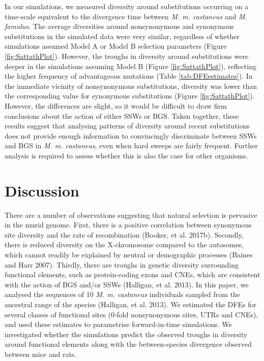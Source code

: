	In our simulations, we measured diversity around substitutions occurring on a time-scale equivalent to the divergence time between \textit{M. m. castaneus} and \textit{M. famulus}. The average diversities around nonsynonymous and synonymous substitutions in the simulated data were very similar, regardless of whether simulations assumed Model A or Model B selection parameters (Figure \ref{fig:SattathPlot}). However, the troughs in diversity around substitutions were deeper in the simulations assuming Model B (Figure \ref{fig:SattathPlot}), reflecting the higher frequency of advantageous mutations (Table \ref{tab:DFEestimates}). In the immediate vicinity of nonsynonymous substitutions, diversity was lower than the corresponding value for synonymous substitutions (Figure \ref{fig:SattathPlot}). However, the differences are slight, so it would be difficult to draw firm conclusions about the action of either SSWs or BGS. Taken together, these results suggest that analysing patterns of diversity around recent substitutions does not provide enough information to convincingly discriminate between SSWs and BGS in \textit{M. m. castaneus}, even when hard sweeps are fairly frequent. Further analysis is required to assess whether this is also the case for other organisms.

\linespread{1}

\linespread{2}

\section{Discussion}

There are a number of observations suggesting that natural selection is pervasive in the murid genome. First, there is a positive correlation between synonymous site diversity and the rate of recombination (Booker, et al. 2017b). Secondly, there is reduced diversity on the X-chromosome compared to the autosomes, which cannot readily be explained by neutral or demographic processes (Baines and Harr 2007). Thirdly, there are troughs in genetic diversity surrounding functional elements, such as protein-coding exons and CNEs, which are consistent with the action of BGS and/or SSWs (Halligan, et al. 2013). In this paper, we analysed the sequences of 10 \textit{M. m. castaneus} individuals sampled from the ancestral range of the species (Halligan, et al. 2013). We estimated the DFEs for several classes of functional sites (0-fold nonsynonymous sites, UTRs and CNEs), and used these estimates to parametrise forward-in-time simulations. We investigated whether the simulations predict the observed troughs in diversity around functional elements along with the between-species divergence observed between mice and rats.

